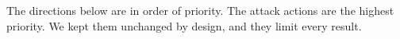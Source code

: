 \documentclass{cshonours}
\begin{document}
The directions below are in order of priority. The attack actions are the
highest priority. We kept them unchanged by design, and they limit every result.
\end{document}
